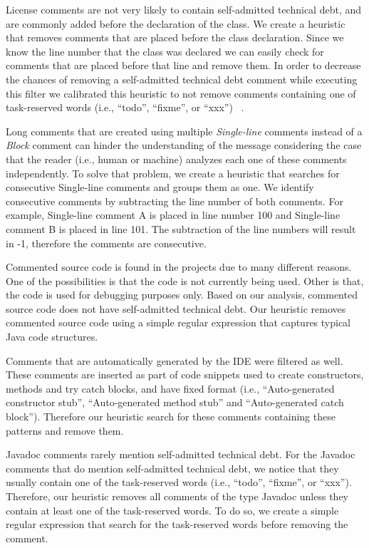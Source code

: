 License comments are not very likely to contain self-admitted technical debt, and are commonly added before the declaration of the class. We create a heuristic that removes comments that are placed before the class declaration. Since we know the line number that the class was declared we can easily check for comments that are placed before that line and remove them. In order to decrease the chances of removing a self-admitted technical debt comment while executing this filter we calibrated this heuristic to not remove comments containing one of task-reserved words (i.e., ``todo'', ``fixme'', or ``xxx'') ~\cite{Storey2008ICSE}.

Long comments that are created using multiple \emph{Single-line} comments instead of a \emph{Block} comment can hinder the understanding of the message considering the case that the reader (i.e., human or machine) analyzes each one of these comments independently. To solve that problem, we create a heuristic that searches for consecutive Single-line comments and groups them as one. We identify consecutive comments by subtracting the line number of both comments. For example, Single-line comment A is placed in line number 100 and Single-line comment B is placed in line 101. The subtraction of the line numbers will result in -1, therefore the comments are consecutive.
 
Commented source code is found in the projects due to many different reasons. One of the possibilities is that the code is not currently being used. Other is that, the code is used for debugging purposes only. Based on our analysis, commented source code does not have self-admitted technical debt. Our heuristic removes commented source code using a simple regular expression that captures typical Java code structures.

Comments that are automatically generated by the IDE were filtered as well. These comments are inserted as part of code snippets used to create constructors, methods and try catch blocks, and have fixed format (i.e., ``Auto-generated constructor stub'', ``Auto-generated method stub'' and ``Auto-generated catch block''). Therefore our heuristic search for these comments containing these patterns and remove them. 

Javadoc comments rarely mention self-admitted technical debt. For the Javadoc comments that do mention self-admitted technical debt, we notice that they usually contain one of the task-reserved words (i.e., ``todo'', ``fixme'', or ``xxx''). Therefore, our heuristic removes all comments of the type Javadoc unless they contain at least one of the task-reserved words. To do so, we create a simple regular expression that search for the task-reserved words before removing the comment.  

